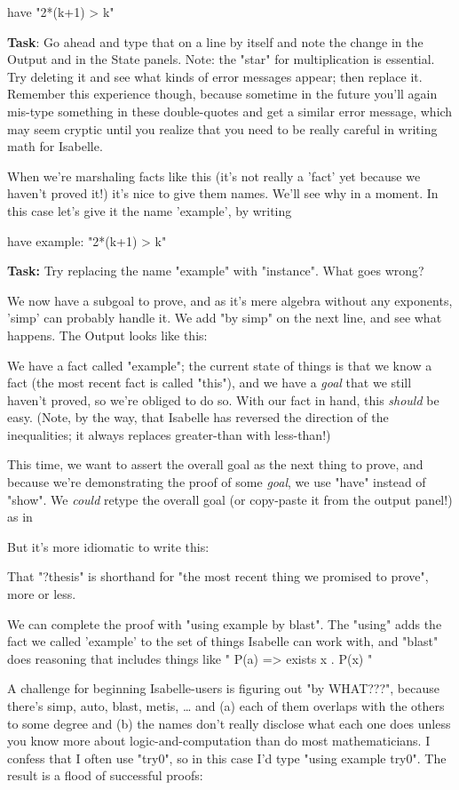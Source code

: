 have "2*(k+1) > k"

\textbf{Task}: Go ahead and type that on a line by itself and note the change in the Output and in the State panels. Note: the "star" for multiplication is essential. Try deleting it and see what kinds of error messages appear; then replace it. Remember this experience though, because sometime in the future you'll again mis-type something in these double-quotes and get a similar error message, which may seem cryptic until you realize that you need to be really careful in writing math for Isabelle.

When we're marshaling facts like this (it's not really a 'fact' yet because we haven't proved it!) it's nice to give them names. We'll see why in a moment. In this case let's give it the name 'example', by writing

have example: "2*(k+1) > k"

\textbf{Task: }Try replacing the name "example" with "instance". What goes wrong? 

We now have a subgoal to prove, and as it's mere algebra without any exponents, 'simp' can probably handle it. We add "by simp" on the next line, and see what happens. The Output looks like this:

We have a fact called "example"; the current state of things is that we know a fact (the most recent fact is called "this"), and we have a \textit{goal} that we still haven't proved, so we're obliged to do so. With our fact in hand, this \textit{should} be easy. (Note, by the way, that Isabelle has reversed the direction of the inequalities; it always replaces greater-than with less-than!)

This time, we want to assert the overall goal as the next thing to prove, and because we're demonstrating the proof of some \textit{goal}, we use "have" instead of "show". We \textit{could} retype the overall goal (or copy-paste it from the output panel!) as in 

But it's more idiomatic to write this:

That "?thesis" is shorthand for "the most recent thing we promised to prove", more or less. 

We can complete the proof with "using example by blast". The "using" adds the fact we called 'example' to the set of things Isabelle can work with, and "blast" does reasoning that includes things like " P(a) => exists x . P(x) "

A challenge for beginning Isabelle-users is figuring out "by WHAT???", because there's simp, auto, blast, metis, … and (a) each of them overlaps with the others to some degree and (b) the names don't really disclose what each one does unless you know more about logic-and-computation than do most mathematicians. I confess that I often use "try0", so in this case I'd type "using example try0". The result is a flood of successful proofs:

